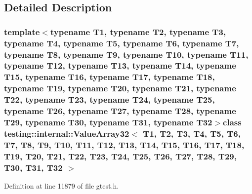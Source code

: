 \subsection{\-Detailed \-Description}
\subsubsection*{template$<$typename T1, typename T2, typename T3, typename T4, typename T5, typename T6, typename T7, typename T8, typename T9, typename T10, typename T11, typename T12, typename T13, typename T14, typename T15, typename T16, typename T17, typename T18, typename T19, typename T20, typename T21, typename T22, typename T23, typename T24, typename T25, typename T26, typename T27, typename T28, typename T29, typename T30, typename T31, typename T32$>$class testing\-::internal\-::\-Value\-Array32$<$ T1, T2, T3, T4, T5, T6, T7, T8, T9, T10, T11, T12, T13, T14, T15, T16, T17, T18, T19, T20, T21, T22, T23, T24, T25, T26, T27, T28, T29, T30, T31, T32 $>$}



\-Definition at line 11879 of file gtest.\-h.



